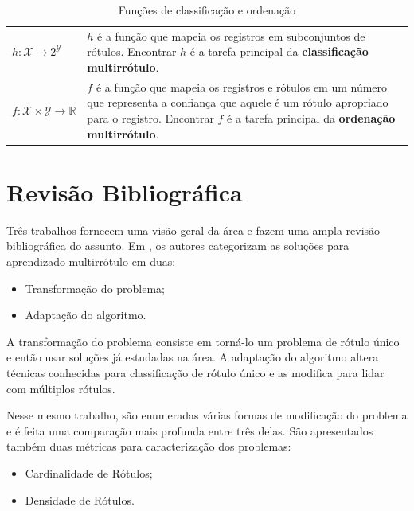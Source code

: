 \documentclass[runningheads,a4paper]{llncs}
\begin{document}
\begin{table}
	\centering
	\begin{tabular}{| >{\centering\arraybackslash}p{4cm} | m{8cm} |}
		\hline
		\multicolumn{2}{|c|}{\textit{Funções}} \\
		\hline
		$h : \mathcal{X} \to 2^\mathcal{Y}$ & $h$ é a função que mapeia os registros em subconjuntos de rótulos. Encontrar $h$ é a tarefa principal da \textbf{classificação multirrótulo}. \\
		\hline
		$f : \mathcal{X} \times \mathcal{Y} \to \mathbb{R}$ & $f$ é a função que mapeia os registros e rótulos em um número que representa a confiança que aquele é um rótulo apropriado para o registro. Encontrar $f$ é a tarefa principal da \textbf{ordenação multirrótulo}. \\
		\hline
	\end{tabular}
	\caption{Funções de classificação e ordenação}
	\label{tab:matematica-funcoes}
\end{table}	


\section{Revisão Bibliográfica}\label{sec:revisao}
Três trabalhos fornecem uma visão geral da área e fazem uma ampla revisão bibliográfica do assunto. Em \cite{Tsoumakas2007-cw}, os autores categorizam as soluções para aprendizado multirrótulo em duas:

\begin{itemize}
\item Transformação do problema;
\item Adaptação do algoritmo.
\end{itemize}

A transformação do problema consiste em torná-lo um problema de rótulo único e então usar soluções já estudadas na área. A adaptação do algoritmo altera técnicas conhecidas para classificação de rótulo único e as modifica para lidar com múltiplos rótulos.

Nesse mesmo trabalho, são enumeradas várias formas de modificação do problema e é feita uma comparação mais profunda entre três delas. São apresentados também duas métricas para caracterização dos problemas:

\begin{itemize}
\item Cardinalidade de Rótulos;
\item Densidade de Rótulos.
\end{itemize}
\end{document}
